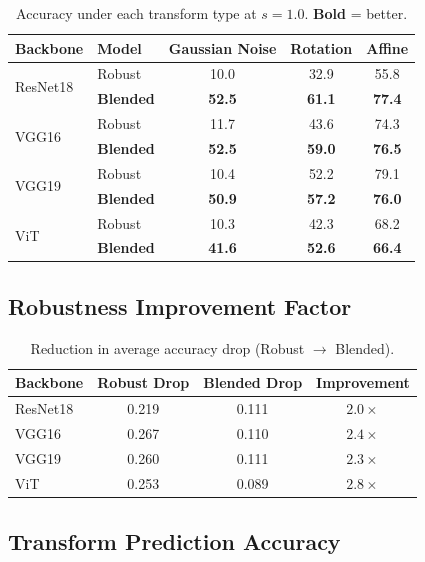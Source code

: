 \documentclass[11pt,a4paper]{article}
\begin{document}
\begin{table}[H]
\centering
\caption{Accuracy under each transform type at $s = 1.0$. \textbf{Bold} = better.}
\label{tab:per_transform}
\begin{tabular}{llccc}
\toprule
\textbf{Backbone} & \textbf{Model} & \textbf{Gaussian Noise} & \textbf{Rotation} & \textbf{Affine} \\
\midrule
\multirow{2}{*}{ResNet18}
 & Robust  & 10.0 & 32.9 & 55.8 \\
 & \textbf{Blended} & \textbf{52.5} & \textbf{61.1} & \textbf{77.4} \\
\midrule
\multirow{2}{*}{VGG16}
 & Robust  & 11.7 & 43.6 & 74.3 \\
 & \textbf{Blended} & \textbf{52.5} & \textbf{59.0} & \textbf{76.5} \\
\midrule
\multirow{2}{*}{VGG19}
 & Robust  & 10.4 & 52.2 & 79.1 \\
 & \textbf{Blended} & \textbf{50.9} & \textbf{57.2} & \textbf{76.0} \\
\midrule
\multirow{2}{*}{ViT}
 & Robust  & 10.3 & 42.3 & 68.2 \\
 & \textbf{Blended} & \textbf{41.6} & \textbf{52.6} & \textbf{66.4} \\
\bottomrule
\end{tabular}
\end{table}

\subsection{Robustness Improvement Factor}

\begin{table}[H]
\centering
\caption{Reduction in average accuracy drop (Robust $\to$ Blended).}
\label{tab:improvement}
\begin{tabular}{lccc}
\toprule
\textbf{Backbone} & \textbf{Robust Drop} & \textbf{Blended Drop} & \textbf{Improvement} \\
\midrule
ResNet18 & 0.219 & 0.111 & $\mathbf{2.0\times}$ \\
VGG16    & 0.267 & 0.110 & $\mathbf{2.4\times}$ \\
VGG19    & 0.260 & 0.111 & $\mathbf{2.3\times}$ \\
ViT      & 0.253 & 0.089 & $\mathbf{2.8\times}$ \\
\bottomrule
\end{tabular}
\end{table}

\subsection{Transform Prediction Accuracy}
\end{document}
